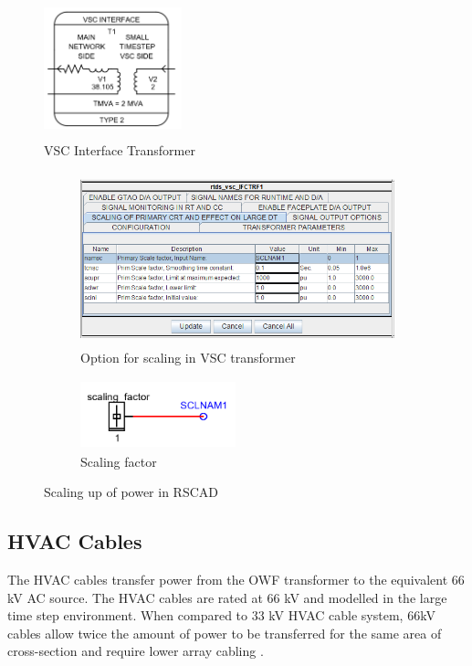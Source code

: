 \begin{figure}[H]
\centering
    \includegraphics[height = 4cm,width = 4cm]{Diagrams/Chapter_3/VSC_interface_trafo_smalldt.PNG}
    \caption{VSC Interface Transformer}
    \label{fig:VSC_interface_trafo_smalldt}
\end{figure}
\vspace{0 mm}
\begin{figure}[H]
\centering
\begin{subfigure}{.55\textwidth}
  \centering
  \includegraphics[height=5cm,width=10cm]{Diagrams/Chapter_3/VSC_interface_trafo_scaling.PNG}
  \caption{Option for scaling in VSC transformer}
  \label{fig:VSC_interface_trafo_scaling}
\end{subfigure}%
\begin{subfigure}{.5\textwidth}
  \centering
  \includegraphics[height=2cm,width=4.5cm]{Diagrams/Chapter_3/scaling_factor_RSCAD.PNG}
  \caption{Scaling factor}
  \label{fig:scaling_factor_RSCAD}
\end{subfigure}
\caption{Scaling up of power in RSCAD}
\label{fig:VSC_trafo_options}
\end{figure}

\subsection{HVAC Cables}\label{HVAC_cable_RSCAD}
The \gls{HVAC} cables transfer power from the \gls{OWF} transformer to the  equivalent 66 kV \gls{AC} source. The \gls{HVAC} cables are rated at 66 kV and modelled in the large time step environment. When compared to 33 kV \gls{HVAC} cable system, 66kV cables allow twice the amount of power to be transferred for the same area of cross-section and require lower array cabling \cite{dnv66kv}. 
 
